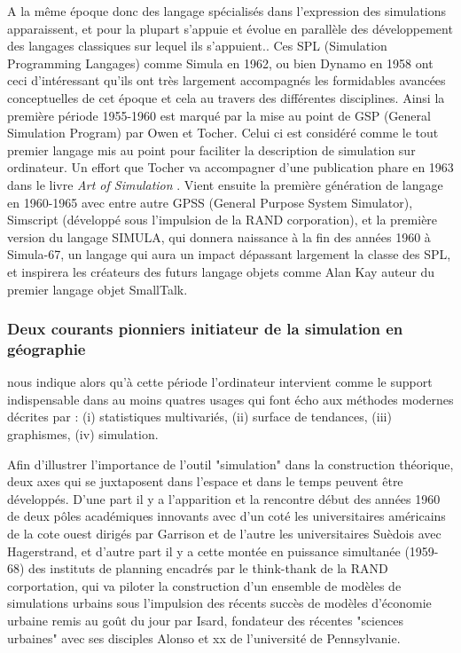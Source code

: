 {A la même époque donc des langage spécialisés dans l'expression des simulations apparaissent, et pour la plupart  s'appuie et évolue en parallèle des développement des langages classiques sur lequel ils s'appuient.. Ces SPL (Simulation Programming Langages) comme Simula en 1962, ou bien Dynamo en 1958 ont ceci d'intéressant qu'ils ont très largement accompagnés les formidables avancées conceptuelles de cet époque et cela au travers des différentes disciplines. Ainsi la première période 1955-1960 est marqué par la mise au point de GSP (General Simulation Program) \autocite{Tocher1960} par Owen et Tocher. Celui ci est considéré comme le tout premier langage mis au point pour faciliter la description de simulation sur ordinateur. Un effort que Tocher va accompagner d'une publication phare en 1963 dans le livre \textit{Art of Simulation} \autocite{Tocher1963} . Vient ensuite la première génération de langage en 1960-1965 avec entre autre GPSS (General Purpose System Simulator), Simscript (développé sous l'impulsion de la RAND corporation), et la première version du langage SIMULA, qui donnera naissance à la fin des années 1960 à Simula-67, un langage qui aura un impact dépassant largement la classe des SPL, et inspirera les créateurs des futurs langage objets comme Alan Kay auteur du premier langage objet SmallTalk. 

\subsubsection{Deux courants pionniers initiateur de la simulation en géographie}
\label{ssubsec:courant_pionniers}

\autocite{Haggett1969} nous indique alors qu'à cette période l'ordinateur intervient comme le support indispensable dans au moins quatres usages qui font écho aux méthodes modernes décrites par \autocite{Claval1977} : (i) statistiques multivariés, (ii) surface de tendances, (iii) graphismes, (iv) simulation. 

Afin d'illustrer l'importance de l'outil "simulation" dans la construction théorique, deux axes qui se juxtaposent dans l'espace et dans le temps peuvent être développés. D'une part il y a l'apparition et la rencontre début des années 1960 de deux pôles académiques innovants avec d'un coté les universitaires américains de la cote ouest dirigés par Garrison et de l'autre les universitaires Suèdois avec Hagerstrand, et d'autre part il y a cette montée en puissance simultanée (1959-68) des instituts de planning encadrés par le think-thank de la RAND corportation, qui va piloter la construction d'un ensemble de modèles de simulations urbains sous l'impulsion des récents succès de modèles d'économie urbaine remis au goût du jour par Isard, fondateur des récentes "sciences urbaines" avec ses disciples Alonso et xx de l'université de Pennsylvanie. \autocite{Batty1976}

}
